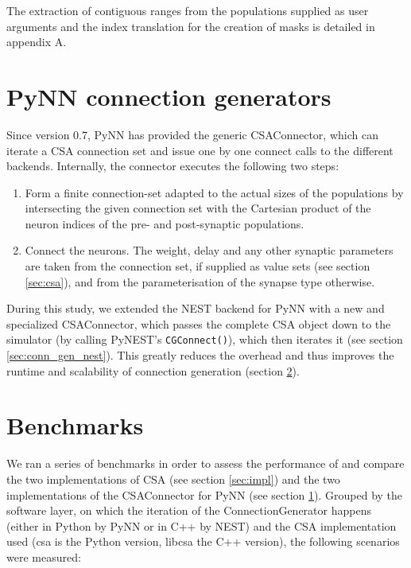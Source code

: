 \documentclass{frontiersSCNS} %
\begin{document}
The extraction of contiguous ranges from the populations supplied as
user arguments and the index translation for the creation of masks is
detailed in appendix A.


\section{PyNN connection generators}\label{sec:conn_gen_pynn}

Since version 0.7, PyNN has provided the generic CSAConnector, which can
iterate a CSA connection set and issue one by one connect calls to
the different backends. Internally, the connector executes the
following two steps:

\begin{enumerate}
\item Form a finite connection-set adapted to the actual sizes of the
  populations by intersecting the given connection set with the
  Cartesian product of the neuron indices of the pre- and
  post-synaptic populations.
\item Connect the neurons. The weight, delay and any other synaptic parameters
  are taken from the connection set, if supplied as value sets (see section \ref{sec:csa}),
  and from the parameterisation of the synapse type otherwise.
\end{enumerate}

During this study, we extended the NEST backend for PyNN with a new
and specialized CSAConnector, which passes the complete CSA object
down to the simulator (by calling PyNEST's \verb|CGConnect()|), which
then iterates it (see section \ref{sec:conn_gen_nest}). This greatly
reduces the overhead and thus improves the runtime and scalability of
connection generation (section \ref{sec:benchmarks}).


\section{Benchmarks}\label{sec:benchmarks}

We ran a series of benchmarks in order to assess the performance of
and compare the two implementations of CSA (see section \ref{sec:impl})
and the two implementations of the CSAConnector for PyNN (see section
\ref{sec:conn_gen_pynn}). Grouped by the software layer, on which the
iteration of the ConnectionGenerator happens (either in Python by PyNN
or in C++ by NEST) and the CSA implementation used (csa is the Python
version, libcsa the C++ version), the following scenarios were
measured:
\end{document}
